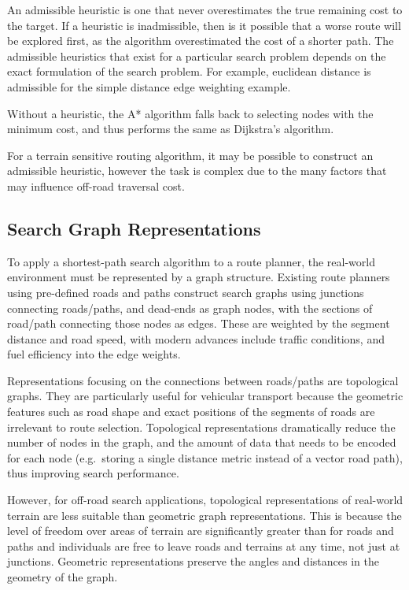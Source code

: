 \documentclass[12pt]{article}
\begin{document}
An admissible heuristic is one that never overestimates the true remaining cost to the target. If a heuristic is inadmissible, then is it possible that a worse route will be explored first, as the algorithm overestimated the cost of a shorter path. The admissible heuristics that exist for a particular search problem depends on the exact formulation of the search problem. For example, euclidean distance is admissible for the simple distance edge weighting example.

Without a heuristic, the A* algorithm falls back to selecting nodes with the minimum cost, and thus performs the same as Dijkstra's algorithm.

For a terrain sensitive routing algorithm, it may be possible to construct an admissible heuristic, however the task is complex due to the many factors that may influence off-road traversal cost.

\subsection{Search Graph Representations}

To apply a shortest-path search algorithm to a route planner, the real-world environment must be represented by a graph structure. Existing route planners using pre-defined roads and paths construct search graphs using junctions connecting roads/paths, and dead-ends as graph nodes, with the sections of road/path connecting those nodes as edges. These are weighted by the segment distance and road speed, with modern advances include traffic conditions, and fuel efficiency into the edge weights.

Representations focusing on the connections between roads/paths are topological graphs. They are particularly useful for vehicular transport because the geometric features such as road shape and exact positions of the segments of roads are irrelevant to route selection. Topological representations dramatically reduce the number of nodes in the graph, and the amount of data that needs to be encoded for each node (e.g.\ storing a single distance metric instead of a vector road path), thus improving search performance.

However, for off-road search applications, topological representations of real-world terrain are less suitable than geometric graph representations. This is because the level of freedom over areas of terrain are significantly greater than for roads and paths and individuals are free to leave roads and terrains at any time, not just at junctions. Geometric representations preserve the angles and distances in the geometry of the graph.
\end{document}
